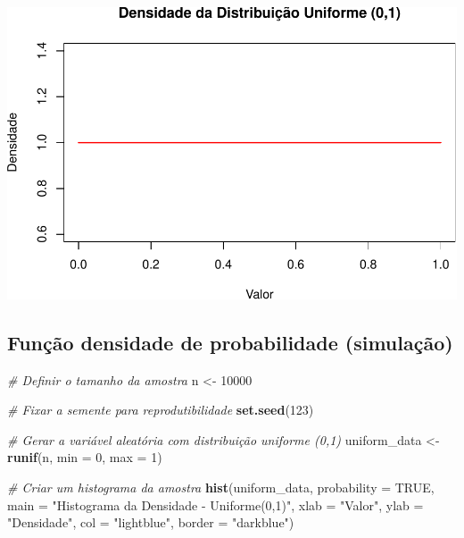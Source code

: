 \documentclass[
]{book}
\newenvironment{Shaded}{\begin{snugshade}}{\end{snugshade}}
\newcommand{\AttributeTok}[1]{\textcolor[rgb]{0.13,0.29,0.53}{#1}}
\newcommand{\CommentTok}[1]{\textcolor[rgb]{0.56,0.35,0.01}{\textit{#1}}}
\newcommand{\ConstantTok}[1]{\textcolor[rgb]{0.56,0.35,0.01}{#1}}
\newcommand{\DecValTok}[1]{\textcolor[rgb]{0.00,0.00,0.81}{#1}}
\newcommand{\FunctionTok}[1]{\textcolor[rgb]{0.13,0.29,0.53}{\textbf{#1}}}
\newcommand{\NormalTok}[1]{#1}
\newcommand{\OtherTok}[1]{\textcolor[rgb]{0.56,0.35,0.01}{#1}}
\newcommand{\StringTok}[1]{\textcolor[rgb]{0.31,0.60,0.02}{#1}}
\begin{document}
\includegraphics{introR_files/figure-latex/unnamed-chunk-269-1.pdf}

\subsection{Função densidade de probabilidade (simulação)}\label{funuxe7uxe3o-densidade-de-probabilidade-simulauxe7uxe3o}

\begin{Shaded}
\begin{Highlighting}[]
\CommentTok{\# Definir o tamanho da amostra}
\NormalTok{n }\OtherTok{\textless{}{-}} \DecValTok{10000}

\CommentTok{\# Fixar a semente para reprodutibilidade}
\FunctionTok{set.seed}\NormalTok{(}\DecValTok{123}\NormalTok{)}

\CommentTok{\# Gerar a variável aleatória com distribuição uniforme (0,1)}
\NormalTok{uniform\_data }\OtherTok{\textless{}{-}} \FunctionTok{runif}\NormalTok{(n, }\AttributeTok{min =} \DecValTok{0}\NormalTok{, }\AttributeTok{max =} \DecValTok{1}\NormalTok{)}

\CommentTok{\# Criar um histograma da amostra }
\FunctionTok{hist}\NormalTok{(uniform\_data, }\AttributeTok{probability =} \ConstantTok{TRUE}\NormalTok{, }
     \AttributeTok{main =} \StringTok{"Histograma da Densidade {-} Uniforme(0,1)"}\NormalTok{, }
     \AttributeTok{xlab =} \StringTok{"Valor"}\NormalTok{, }
     \AttributeTok{ylab =} \StringTok{"Densidade"}\NormalTok{, }
     \AttributeTok{col =} \StringTok{"lightblue"}\NormalTok{, }
     \AttributeTok{border =} \StringTok{"darkblue"}\NormalTok{)}
\end{Highlighting}
\end{Shaded}
\end{document}
